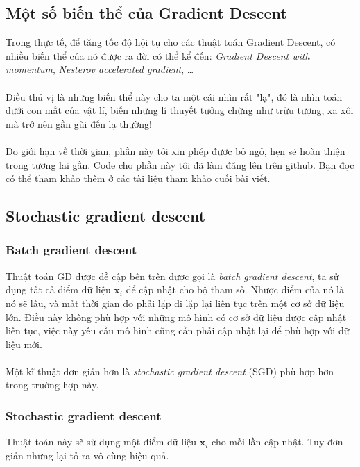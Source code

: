 \documentclass{article}
\begin{document}
\subsection{Một số biến thể của Gradient Descent}
Trong thực tế, để tăng tốc độ hội tụ cho các thuật toán Gradient Descent, có nhiều biến thể của nó được ra đời có thể kể đến: \textit{Gradient Descent with momentum}, \textit{Nesterov accelerated gradient}, \ldots
\\\\
Điều thú vị là những biến thể này cho ta một cái nhìn rất "lạ", đó là nhìn toán dưới con mắt của vật lí, biến những lí thuyết tưởng chừng như trừu tượng, xa xôi mà trở nên gần gũi đến lạ thường!\\\\
Do giới hạn về thời gian, phần này tôi xin phép được bỏ ngỏ, hẹn sẽ hoàn thiện trong tương lai gần. Code cho phần này tôi đã làm đăng lên trên github. Bạn đọc có thể tham khảo thêm ở các tài liệu tham khảo cuối bài viết.
\subsection{Stochastic gradient descent}
\subsubsection{Batch gradient descent}
Thuật toán GD được đề cập bên trên được gọi là \textit{batch gradient descent}, ta sử dụng tất cả điểm dữ liệu $\textbf{x}_i$ để cập nhật cho bộ tham số. Nhược điểm của nó là nó sẽ lâu, và mất thời gian do phải lặp đi lặp lại liên tục trên một cơ sở dữ liệu lớn. Điều này không phù hợp với những mô hình có cơ sở dữ liệu được cập nhật liên tục, việc này yêu cầu mô hình cũng cần phải cập nhật lại để phù hợp với dữ liệu mới.\\\\
Một kĩ thuật đơn giản hơn là \textit{stochastic gradient descent} (SGD) phù hợp hơn trong trường hợp này.
\subsubsection{Stochastic gradient descent}
Thuật toán này sẽ sử dụng một điểm dữ liệu $\textbf{x}_i$ cho mỗi lần cập nhật. Tuy đơn giản nhưng lại tỏ ra vô cùng hiệu quả.
\end{document}

